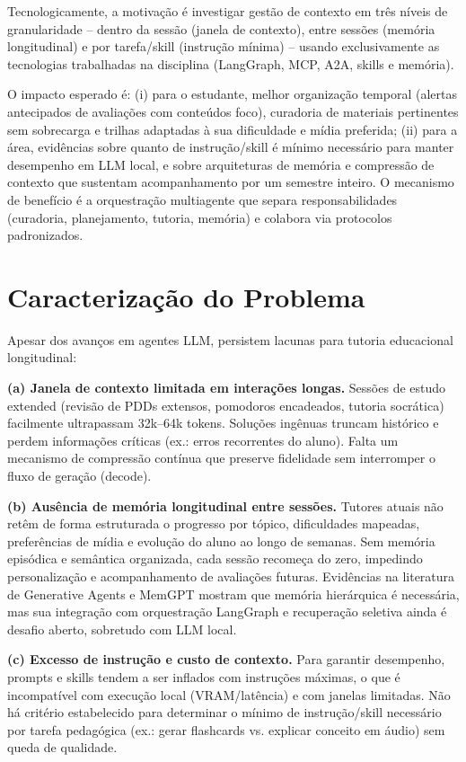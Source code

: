 \documentclass[12pt]{article}
\begin{document}
Tecnologicamente, a motivação é investigar gestão de contexto em três níveis de granularidade -- dentro da sessão (janela de contexto), entre sessões (memória longitudinal) e por tarefa/skill (instrução mínima) -- usando exclusivamente as tecnologias trabalhadas na disciplina (LangGraph, MCP, A2A, skills e memória).

O impacto esperado é: (i) para o estudante, melhor organização temporal (alertas antecipados de avaliações com conteúdos foco), curadoria de materiais pertinentes sem sobrecarga e trilhas adaptadas à sua dificuldade e mídia preferida; (ii) para a área, evidências sobre quanto de instrução/skill é mínimo necessário para manter desempenho em LLM local, e sobre arquiteturas de memória e compressão de contexto que sustentam acompanhamento por um semestre inteiro. O mecanismo de benefício é a orquestração multiagente que separa responsabilidades (curadoria, planejamento, tutoria, memória) e colabora via protocolos padronizados.

\section{Caracterização do Problema}
\label{sec:problema}

Apesar dos avanços em agentes LLM, persistem lacunas para tutoria educacional longitudinal:

\textbf{(a) Janela de contexto limitada em interações longas.} Sessões de estudo extended (revisão de PDDs extensos, pomodoros encadeados, tutoria socrática) facilmente ultrapassam 32k--64k tokens. Soluções ingênuas truncam histórico e perdem informações críticas (ex.: erros recorrentes do aluno). Falta um mecanismo de compressão contínua que preserve fidelidade sem interromper o fluxo de geração (decode).

\textbf{(b) Ausência de memória longitudinal entre sessões.} Tutores atuais não retêm de forma estruturada o progresso por tópico, dificuldades mapeadas, preferências de mídia e evolução do aluno ao longo de semanas. Sem memória episódica e semântica organizada, cada sessão recomeça do zero, impedindo personalização e acompanhamento de avaliações futuras. Evidências na literatura de Generative Agents e MemGPT mostram que memória hierárquica é necessária, mas sua integração com orquestração LangGraph e recuperação seletiva ainda é desafio aberto, sobretudo com LLM local.

\textbf{(c) Excesso de instrução e custo de contexto.} Para garantir desempenho, prompts e skills tendem a ser inflados com instruções máximas, o que é incompatível com execução local (VRAM/latência) e com janelas limitadas. Não há critério estabelecido para determinar o mínimo de instrução/skill necessário por tarefa pedagógica (ex.: gerar flashcards vs. explicar conceito em áudio) sem queda de qualidade.
\end{document}
